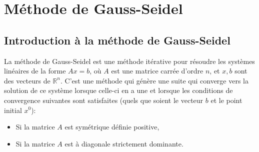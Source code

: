 




% 

\section{Méthode de Gauss-Seidel}
\subsection{Introduction à la méthode de Gauss-Seidel}
La méthode de Gauss-Seidel est une méthode itérative pour résoudre 
les systèmes linéaires de la forme $Ax=b$, où $A$ est une matrice carrée d'ordre $n$, et $x, b$ sont des vecteurs de $\mathbb{R}^n$. 
C'est une méthode qui génère 
une suite qui converge vers la solution de ce système lorsque celle-ci en a une et lorsque les conditions de convergence suivantes sont satisfaites (quels que soient le vecteur $b$ et le point initial $x^0$):
\begin{itemize}
  \item Si la matrice $A$ est symétrique définie positive,
  \item Si la matrice $A$ est à diagonale strictement dominante.
\end{itemize}
